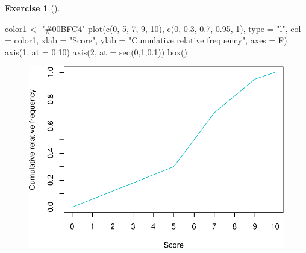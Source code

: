\documentclass[
  a4paper,
]{scrreport}
\newenvironment{Shaded}{\begin{snugshade}}{\end{snugshade}}
\newcommand{\AttributeTok}[1]{\textcolor[rgb]{0.40,0.45,0.13}{#1}}
\newcommand{\DecValTok}[1]{\textcolor[rgb]{0.68,0.00,0.00}{#1}}
\newcommand{\FloatTok}[1]{\textcolor[rgb]{0.68,0.00,0.00}{#1}}
\newcommand{\FunctionTok}[1]{\textcolor[rgb]{0.28,0.35,0.67}{#1}}
\newcommand{\NormalTok}[1]{\textcolor[rgb]{0.00,0.23,0.31}{#1}}
\newcommand{\OtherTok}[1]{\textcolor[rgb]{0.00,0.23,0.31}{#1}}
\newcommand{\SpecialCharTok}[1]{\textcolor[rgb]{0.37,0.37,0.37}{#1}}
\newcommand{\StringTok}[1]{\textcolor[rgb]{0.13,0.47,0.30}{#1}}
\theoremstyle{definition}
\newtheorem{exercise}{Exercise}[chapter]
\theoremstyle{remark}
\begin{document}
\begin{exercise}[]
\begin{tcolorbox}
\begin{Shaded}
\begin{Highlighting}[]
\NormalTok{color1 }\OtherTok{\textless{}{-}} \StringTok{"\#00BFC4"}
\FunctionTok{plot}\NormalTok{(}\FunctionTok{c}\NormalTok{(}\DecValTok{0}\NormalTok{, }\DecValTok{5}\NormalTok{, }\DecValTok{7}\NormalTok{, }\DecValTok{9}\NormalTok{, }\DecValTok{10}\NormalTok{), }\FunctionTok{c}\NormalTok{(}\DecValTok{0}\NormalTok{, }\FloatTok{0.3}\NormalTok{, }\FloatTok{0.7}\NormalTok{, }\FloatTok{0.95}\NormalTok{, }\DecValTok{1}\NormalTok{), }\AttributeTok{type =} \StringTok{"l"}\NormalTok{, }\AttributeTok{col =}\NormalTok{ color1, }\AttributeTok{xlab =} \StringTok{"Score"}\NormalTok{, }\AttributeTok{ylab =} \StringTok{"Cumulative relative frequency"}\NormalTok{, }\AttributeTok{axes =}\NormalTok{ F)}
\FunctionTok{axis}\NormalTok{(}\DecValTok{1}\NormalTok{, }\AttributeTok{at =} \DecValTok{0}\SpecialCharTok{:}\DecValTok{10}\NormalTok{)}
\FunctionTok{axis}\NormalTok{(}\DecValTok{2}\NormalTok{, }\AttributeTok{at =} \FunctionTok{seq}\NormalTok{(}\DecValTok{0}\NormalTok{,}\DecValTok{1}\NormalTok{,}\FloatTok{0.1}\NormalTok{))}
\FunctionTok{box}\NormalTok{()}
\end{Highlighting}
\end{Shaded}

\begin{figure}[H]

{\centering \includegraphics{img/exam-2023-03-23/ogive-scores-1.pdf}

}

\end{figure}


\end{tcolorbox}
\end{exercise}
\end{document}
